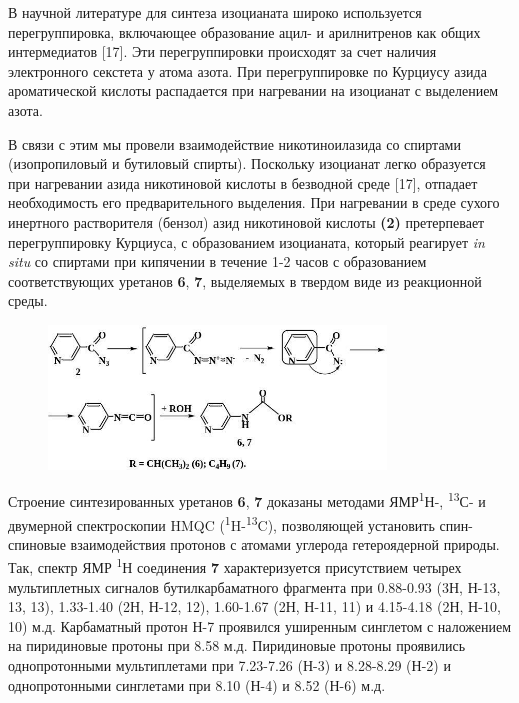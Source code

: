 В научной литературе для синтеза изоцианата широко используется
перегруппировка, включающее образование ацил- и арилнитренов как общих
интермедиатов {[}17{]}. Эти перегруппировки происходят за счет наличия
электронного секстета у атома азота. При перегруппировке по Курциусу
азида ароматической кислоты распадается при нагревании на изоцианат с
выделением азота.

В связи с этим мы провели взаимодействие никотиноилазида со спиртами
(изопропиловый и бутиловый спирты). Поскольку изоцианат легко образуется
при нагревании азида никотиновой кислоты в безводной среде {[}17{]},
отпадает необходимость его предварительного выделения. При нагревании в
среде сухого инертного растворителя (бензол) азид никотиновой кислоты
{\bfseries (2)} претерпевает перегруппировку Курциуса, с образованием
изоцианата, который реагирует \emph{in situ} со спиртами при кипячении в
течение 1-2 часов с образованием соответствующих уретанов {\bfseries 6},
{\bfseries 7}, выделяемых в твердом виде из реакционной среды.

\begin{figure}[H]
	\centering
	\includegraphics[width=0.8\textwidth]{assets/5}
	\caption*{}
\end{figure}

Строение синтезированных уретанов {\bfseries 6}, {\bfseries 7} доказаны
методами ЯМР\textsuperscript{1}Н-, \textsuperscript{13}С- и двумерной
спектроскопии HMQC (\textsuperscript{1}H-\textsuperscript{13}C),
позволяющей установить спин-спиновые взаимодействия протонов с атомами
углерода гетероядерной природы. Так, спектр ЯМР \textsuperscript{1}Н
соединения {\bfseries 7} характеризуется присутствием четырех мультиплетных
сигналов бутилкарбаматного фрагмента при 0.88-0.93 (3Н, Н-13, 13, 13),
1.33-1.40 (2Н, Н-12, 12), 1.60-1.67 (2Н, Н-11, 11) и 4.15-4.18 (2Н,
Н-10, 10) м.д. Карбаматный протон Н-7 проявился уширенным синглетом с
наложением на пиридиновые протоны при 8.58 м.д. Пиридиновые протоны
проявились однопротонными мультиплетами при 7.23-7.26 (Н-3) и 8.28-8.29
(Н-2) и однопротонными синглетами при 8.10 (Н-4) и 8.52 (Н-6) м.д.

